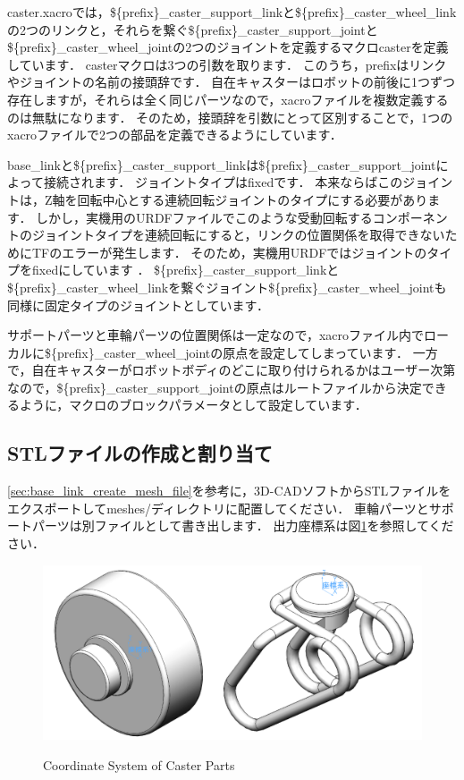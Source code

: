 \documentclass[{../../master}]{subfiles}
\begin{document}
\textsf{caster.xacro}では，\textsf{\$\{prefix\}\_caster\_support\_link}と\textsf{\$\{prefix\}\_caster\_wheel\_link}の2つのリンクと，それらを繋ぐ\textsf{\$\{prefix\}\_caster\_support\_joint}と\textsf{\$\{prefix\}\_caster\_wheel\_joint}の2つのジョイントを定義するマクロ\textsf{caster}を定義しています．
\textsf{caster}マクロは3つの引数を取ります．
このうち，\textsf{prefix}はリンクやジョイントの名前の接頭辞です．
自在キャスターはロボットの前後に1つずつ存在しますが，それらは全く同じパーツなので，xacroファイルを複数定義するのは無駄になります．
そのため，接頭辞を引数にとって区別することで，1つのxacroファイルで2つの部品を定義できるようにしています．

\textsf{base\_link}と\textsf{\$\{prefix\}\_caster\_support\_link}は\textsf{\$\{prefix\}\_caster\_support\_joint}によって接続されます．
ジョイントタイプは\textsf{fixed}です．
本来ならばこのジョイントは，Z軸を回転中心とする連続回転ジョイントのタイプにする必要があります．
しかし，実機用のURDFファイルでこのような受動回転するコンポーネントのジョイントタイプを連続回転にすると，リンクの位置関係を取得できないためにTFのエラーが発生します．
そのため，実機用URDFではジョイントのタイプを\textsf{fixed}にしています
．
\textsf{\$\{prefix\}\_caster\_support\_link}と\textsf{\$\{prefix\}\_caster\_wheel\_link}を繋ぐジョイント\textsf{\$\{prefix\}\_caster\_wheel\_joint}も同様に固定タイプのジョイントとしています．

サポートパーツと車輪パーツの位置関係は一定なので，xacroファイル内でローカルに\textsf{\$\{prefix\}\_caster\_wheel\_joint}の原点を設定してしまっています．
一方で，自在キャスターがロボットボディのどこに取り付けられるかはユーザー次第なので，\textsf{\$\{prefix\}\_caster\_support\_joint}の原点はルートファイルから決定できるように，マクロのブロックパラメータとして設定しています．

\subsection{STLファイルの作成と割り当て}

\ref{sec:base_link_create_mesh_file}を参考に，3D-CADソフトからSTLファイルをエクスポートして\textsf{meshes/}ディレクトリに配置してください．
車輪パーツとサポートパーツは別ファイルとして書き出します．
出力座標系は図\ref{fig:caster_link_coordinate}を参照してください．

\begin{figure}[ht]
  \centering
  \includegraphics[height=40truemm]{images/caster_link_coordinate.drawio.png}
  \label{fig:caster_link_coordinate}
  \caption{Coordinate System of Caster Parts}
\end{figure}
\end{document}
